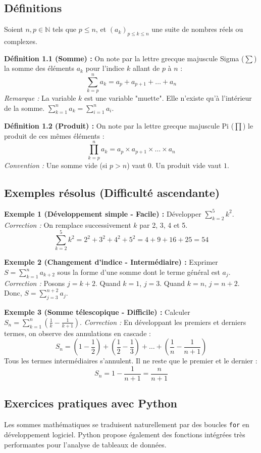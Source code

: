 \documentclass[12pt,a4paper]{report}
\begin{document}
\subsection{Définitions}
Soient $n, p \in \mathbb{N}$ tels que $p \le n$, et $(a_k)_{p \le k \le n}$ une suite de nombres réels ou complexes.

\textbf{Définition 1.1 (Somme) :} On note par la lettre grecque majuscule Sigma ($\sum$) la somme des éléments $a_k$ pour l'indice $k$ allant de $p$ à $n$ :
\[ \sum_{k=p}^{n} a_k = a_p + a_{p+1} + \dots + a_n \]
\textit{Remarque :} La variable $k$ est une variable "muette". Elle n'existe qu'à l'intérieur de la somme. $\sum_{k=1}^n a_k = \sum_{i=1}^n a_i$.

\textbf{Définition 1.2 (Produit) :} On note par la lettre grecque majuscule Pi ($\prod$) le produit de ces mêmes éléments :
\[ \prod_{k=p}^{n} a_k = a_p \times a_{p+1} \times \dots \times a_n \]
\textit{Convention :} Une somme vide (si $p > n$) vaut $0$. Un produit vide vaut $1$.

\subsection{Exemples résolus (Difficulté ascendante)}

\textbf{Exemple 1 (Développement simple - Facile) :} 
Développer $\sum_{k=2}^{5} k^2$.
\textit{Correction :} On remplace successivement $k$ par 2, 3, 4 et 5.
\[ \sum_{k=2}^{5} k^2 = 2^2 + 3^2 + 4^2 + 5^2 = 4 + 9 + 16 + 25 = 54 \]

\textbf{Exemple 2 (Changement d'indice - Intermédiaire) :}
Exprimer $S = \sum_{k=1}^{n} a_{k+2}$ sous la forme d'une somme dont le terme général est $a_j$.
\textit{Correction :} Posons $j = k+2$. 
Quand $k=1$, $j=3$. Quand $k=n$, $j=n+2$.
Donc, $S = \sum_{j=3}^{n+2} a_j$.

\textbf{Exemple 3 (Somme télescopique - Difficile) :}
Calculer $S_n = \sum_{k=1}^{n} \left( \frac{1}{k} - \frac{1}{k+1} \right)$.
\textit{Correction :} En développant les premiers et derniers termes, on observe des annulations en cascade :
\[ S_n = \left(1 - \frac{1}{2}\right) + \left(\frac{1}{2} - \frac{1}{3}\right) + \dots + \left(\frac{1}{n} - \frac{1}{n+1}\right) \]
Tous les termes intermédiaires s'annulent. Il ne reste que le premier et le dernier :
\[ S_n = 1 - \frac{1}{n+1} = \frac{n}{n+1} \]

\subsection{Exercices pratiques avec Python}
Les sommes mathématiques se traduisent naturellement par des boucles \texttt{for} en développement logiciel. Python propose également des fonctions intégrées très performantes pour l'analyse de tableaux de données.
\end{document}
